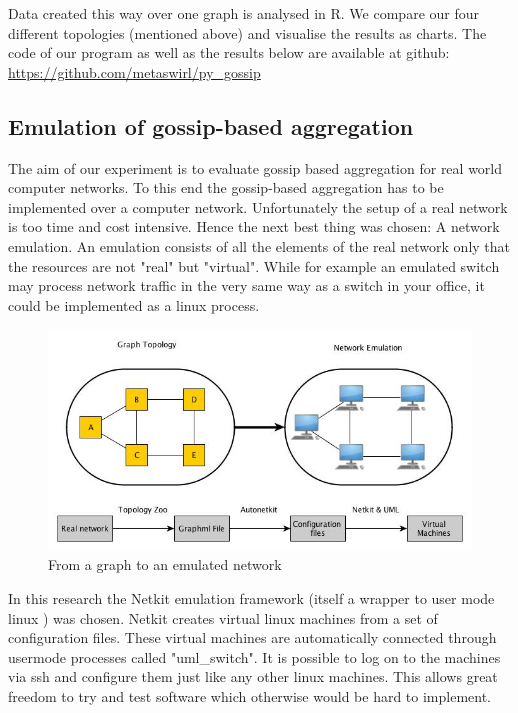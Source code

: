 Data created this way over one graph is analysed in R. We compare our four different topologies (mentioned above) and visualise the results as charts. The code of our program as well as the results below are available at github: \url{https://github.com/metaswirl/py_gossip}

\subsection{Emulation of gossip-based aggregation}
The aim of our experiment is to evaluate gossip based aggregation for real world computer networks. To this end the gossip-based aggregation has to be implemented over a computer network. Unfortunately the setup of a real network is too time and cost intensive. Hence the next best thing was chosen: A network emulation. 
An emulation consists of all the elements of the real network only that the resources are not "real" but "virtual". While for example an emulated switch may process network traffic in the very same way as a switch in your office, it could be implemented as a linux process.

\begin{figure}[h!]
    \begin{center}
        \includegraphics[scale=0.6]{graph_to_emulation}
    \end{center}
    \caption{From a graph to an emulated network}
    \label{fig:graph_to_emulation}
\end{figure}

In this research the Netkit emulation framework (itself a wrapper to user mode linux \cite{uml}) was chosen. Netkit \cite{netkit} creates virtual linux machines from a set of configuration files. These virtual machines are automatically connected through usermode processes called "uml\_switch". It is possible to log on to the machines via ssh and configure them just like any other linux machines. This allows great freedom to try and test software which otherwise would be hard to implement.

